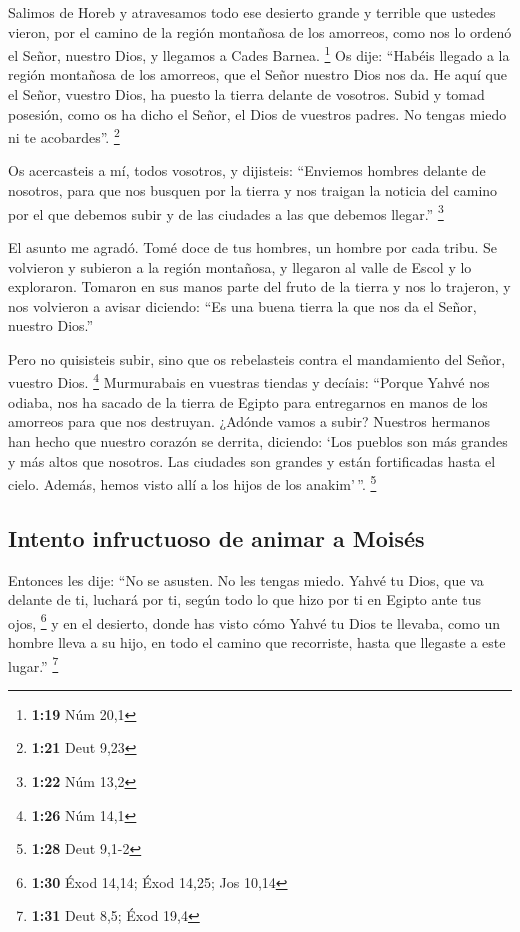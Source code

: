  Salimos de Horeb y atravesamos todo ese desierto grande
y terrible que ustedes vieron, por el camino de la región montañosa de
los amorreos, como nos lo ordenó el Señor, nuestro Dios, y llegamos a
Cades Barnea. \footnote{\textbf{1:19} Núm 20,1}  Os dije:
``Habéis llegado a la región montañosa de los amorreos, que el Señor
nuestro Dios nos da.  He aquí que el Señor, vuestro Dios,
ha puesto la tierra delante de vosotros. Subid y tomad posesión, como os
ha dicho el Señor, el Dios de vuestros padres. No tengas miedo ni te
acobardes''. \footnote{\textbf{1:21} Deut 9,23}

 Os acercasteis a mí, todos vosotros, y dijisteis:
``Enviemos hombres delante de nosotros, para que nos busquen por la
tierra y nos traigan la noticia del camino por el que debemos subir y de
las ciudades a las que debemos llegar.'' \footnote{\textbf{1:22} Núm
  13,2}

 El asunto me agradó. Tomé doce de tus hombres, un hombre
por cada tribu.  Se volvieron y subieron a la región
montañosa, y llegaron al valle de Escol y lo exploraron. 
Tomaron en sus manos parte del fruto de la tierra y nos lo trajeron, y
nos volvieron a avisar diciendo: ``Es una buena tierra la que nos da el
Señor, nuestro Dios.''

 Pero no quisisteis subir, sino que os rebelasteis contra
el mandamiento del Señor, vuestro Dios. \footnote{\textbf{1:26} Núm 14,1}
 Murmurabais en vuestras tiendas y decíais: ``Porque
Yahvé nos odiaba, nos ha sacado de la tierra de Egipto para entregarnos
en manos de los amorreos para que nos destruyan.  ¿Adónde
vamos a subir? Nuestros hermanos han hecho que nuestro corazón se
derrita, diciendo: `Los pueblos son más grandes y más altos que
nosotros. Las ciudades son grandes y están fortificadas hasta el cielo.
Además, hemos visto allí a los hijos de los anakim'\,''. \footnote{\textbf{1:28}
  Deut 9,1-2}

\hypertarget{intento-infructuoso-de-animar-a-moisuxe9s}{%
\subsection{Intento infructuoso de animar a
Moisés}\label{intento-infructuoso-de-animar-a-moisuxe9s}}

 Entonces les dije: ``No se asusten. No les tengas miedo.
 Yahvé tu Dios, que va delante de ti, luchará por ti,
según todo lo que hizo por ti en Egipto ante tus ojos, \footnote{\textbf{1:30}
  Éxod 14,14; Éxod 14,25; Jos 10,14}  y en el desierto,
donde has visto cómo Yahvé tu Dios te llevaba, como un hombre lleva a su
hijo, en todo el camino que recorriste, hasta que llegaste a este
lugar.'' \footnote{\textbf{1:31} Deut 8,5; Éxod 19,4}

